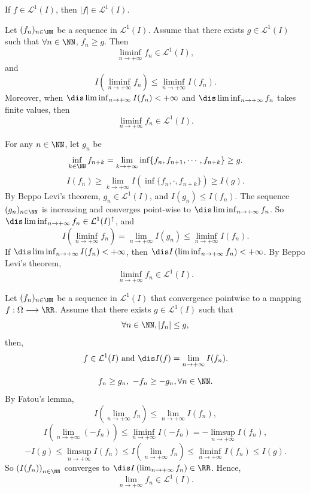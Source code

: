 \begin{remark}
    If $f\in\mathcal{L}^1(I)$, then $|f|\in \mathcal{L}^1(I)$.
\end{remark}
\begin{theoremenv}
    Let $(f_n)_{n\in\NN}$ be a sequence in $\mathcal{L}^1(I)$. Assume that there exists $g\in \mathcal{L}^1(I)$ such that $\forall n\in \NN$, $f_n\ge g$. Then
    $$ \liminf_{n\rightarrow +\infty}f_n\in \mathcal{L}^1(I),$$
    and 
    $$ I\left(\liminf_{n\rightarrow +\infty}f_n\right)\le \liminf_{n\rightarrow +\infty}I(f_n).$$
    Moreover, when $\dis \liminf_{n\rightarrow +\infty}I(f_n)<+\infty$ and $\dis \liminf_{n\rightarrow +\infty}f_n$ takes finite values, then
    $$ \liminf_{n\rightarrow +\infty}f_n\in \mathcal{L}^1(I).$$
\end{theoremenv}
\begin{proofenv}
    For any $n\in\NN$, let $g_n$ be 
    $$ \inf_{k\in \NN}f_{n+k}=\lim_{k\rightarrow +\infty} \inf\{f_n,f_{n+1},\cdots,f_{n+k}\}\ge g.$$
    $$ I(f_n)\ge \lim_{k\rightarrow +\infty}I\left(\inf\{f_n,\cdot,f_{n+k}\}\right)\ge I(g).$$
    By Beppo Levi's theorem, $g_n\in \mathcal{L}^1(I)$, and $I(g_n)\le I(f_n).$
    The sequence $(g_n)_{n\in\NN}$ is increasing and converges point-wise to $\dis \liminf_{n\rightarrow +\infty}f_n$.
    So $\dis \liminf_{n\rightarrow +\infty} f_n\in \mathcal{L}^1(I)^\uparrow$, and
    $$ I\left(\liminf_{n\rightarrow +\infty}f_n\right)=\lim_{n\rightarrow +\infty}I(g_n)\le \liminf_{n\rightarrow +\infty}I(f_n).$$
    If $\dis \liminf_{n\rightarrow +\infty}I(f_n)<+\infty$, then $\dis I\left(\liminf_{n\rightarrow +\infty} f_n\right)<+\infty$. By Beppo Levi's theorem, 
    $$\liminf_{n\rightarrow +\infty}f_n\in \mathcal{L}^1(I).$$
\end{proofenv}
\begin{theoremenv}
    Let $(f_n)_{n\in\NN}$ be a sequence in $\mathcal{L}^1(I)$ that convergence pointwise to a mapping $f:\Omega\longrightarrow \RR$. Assume that there exists $g\in \mathcal{L}^1(I)$ such that
    $$ \forall n\in\NN, |f_n|\le g,$$
    then, 
    $$f\in \mathcal{L}^1(I)\text{ and }\dis I(f)=\lim_{n\rightarrow +\infty}I(f_n).$$
\end{theoremenv}
\begin{proofenv}
    $$ f_n\ge g_n,\ -f_n\ge -g_n, \forall n\in\NN.$$
    By Fatou's lemma,
    $$ I(\lim_{n\rightarrow +\infty}f_n)\le \lim_{n\rightarrow +\infty}I(f_n),$$
    $$I(\lim_{n\rightarrow +\infty}(-f_n))\le \liminf_{n\rightarrow +\infty}I(-f_n)=-\limsup_{n\rightarrow +\infty}I(f_n),$$
    $$ -I(g)\le \limsup_{n\rightarrow +\infty}I(f_n)\le I(\lim_{n\rightarrow +\infty}f_n)\le \liminf_{n\rightarrow +\infty}I(f_n)\le I(g).$$
    So $\left(I(f_n)\right)_{n\in\NN}$ converges to $\dis I\left(\lim_{n\rightarrow +\infty}f_n\right)\in \RR$. Hence,
    $$ \lim_{n\rightarrow +\infty} f_n\in \mathcal{L}^1(I).$$
\end{proofenv}
